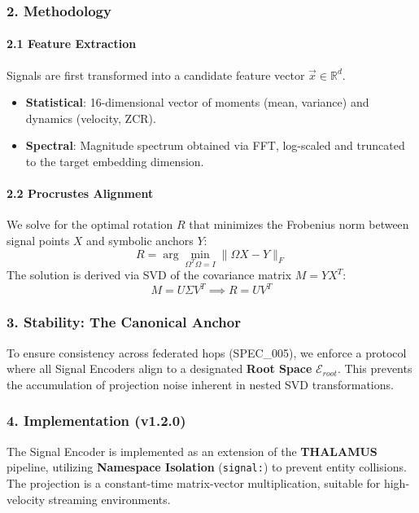 \subsubsection{2. Methodology}

\paragraph{2.1 Feature Extraction}
Signals are first transformed into a candidate feature vector $\vec{x} \in \mathbb{R}^d$.
\begin{itemize}
\item \textbf{Statistical}: 16-dimensional vector of moments (mean, variance) and dynamics (velocity, ZCR).
\item \textbf{Spectral}: Magnitude spectrum obtained via FFT, log-scaled and truncated to the target embedding dimension.

\end{itemize}
\paragraph{2.2 Procrustes Alignment}
We solve for the optimal rotation $R$ that minimizes the Frobenius norm between signal points $X$ and symbolic anchors $Y$:
\begin{equation}
R = \arg\min_{\Omega^T\Omega=I} \| \Omega X - Y \|_F
\end{equation}
The solution is derived via SVD of the covariance matrix $M = Y X^T$:
\begin{equation}
M = U \Sigma V^T \implies R = U V^T
\end{equation}

\subsubsection{3. Stability: The Canonical Anchor}
To ensure consistency across federated hops (SPEC\_005), we enforce a protocol where all Signal Encoders align to a designated \textbf{Root Space} $\mathcal{E}_{root}$. This prevents the accum\-ulation of projection noise inherent in nested SVD trans\-formations.

\subsubsection{4. Implem\-entation (v1.2.0)}
The Signal Encoder is implemented as an extension of the \textbf{THALAMUS} pipeline, utilizing \textbf{Namespace Isolation} (\texttt{signal:}) to prevent entity collisions. The projection is a constant-time matrix-vector multi\-plication, suitable for high-velocity streaming envir\-onments.

